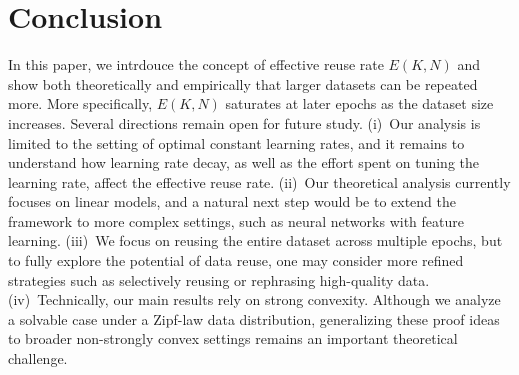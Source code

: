 \vspace{-0.5cm}
\section{Conclusion}
\label{sec:conclusion}
\vspace{-0.4cm}



In this paper, we intrdouce the concept of effective reuse rate $E(K,N)$ and show both theoretically and empirically that larger datasets can be repeated more. More specifically, $E(K, N)$ saturates at later epochs as the dataset size increases.
Several directions remain open for future study. 
(i)~Our analysis is limited to the setting of optimal constant learning rates, and it remains to understand how learning rate decay, as well as the effort spent on tuning the learning rate, affect the effective reuse rate.
(ii)~Our theoretical analysis currently focuses on linear models, and a natural next step would be to extend the framework to more complex settings, such as neural networks with feature learning.
(iii)~We focus on reusing the entire dataset across multiple epochs, but to fully explore the potential of data reuse, one may consider more refined strategies such as selectively reusing or rephrasing high-quality data.
(iv)~Technically, our main results rely on strong convexity. Although we analyze a solvable case under a Zipf-law data distribution, generalizing these proof ideas to broader non-strongly convex settings remains an important theoretical challenge.


